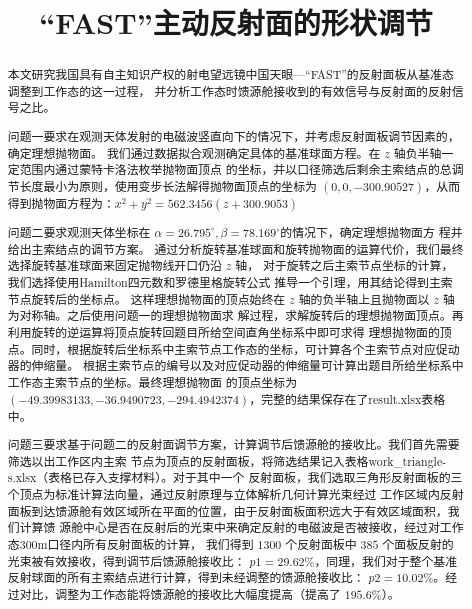 \documentclass[withoutpreface,bwprint]{cumcmthesis} %
\title{“FAST”主动反射面的形状调节}
\begin{document}
\maketitle
\begin{abstract}
本文研究我国具有自主知识产权的射电望远镜中国天眼---“FAST”的反射面板从基准态调整到工作态的这一过程，
并分析工作态时馈源舱接收到的有效信号与反射面的反射信号之比。

问题一要求在观测天体发射的电磁波竖直向下的情况下，并考虑反射面板调节因素的，确定理想抛物面。
我们通过数据拟合观测确定具体的基准球面方程。在 $z$ 轴负半轴一定范围内通过蒙特卡洛法枚举抛物面顶点
的坐标，并以口径筛选后剩余主索结点的总调节长度最小为原则，使用变步长法解得抛物面顶点的坐标为
$(0,0,-300.90527)$，从而得到抛物面方程为：$x^2+y^2=562.3456(z+300.9053)$

问题二要求观测天体坐标在 $\alpha =26.795^\circ,\beta =78.169^\circ$的情况下，确定理想抛物面方
程并给出主索结点的调节方案。
通过分析旋转基准球面和旋转抛物面的运算代价，我们最终选择旋转基准球面来固定抛物线开口仍沿 $z$ 轴，
对于旋转之后主索节点坐标的计算，我们选择使用Hamilton四元数\cite{Hamilton2006}和罗德里格旋转公式
推导一个引理，用其结论得到主索节点旋转后的坐标点。
这样理想抛物面的顶点始终在 $z$ 轴的负半轴上且抛物面以 $z$ 轴为对称轴。之后使用问题一的理想抛物面求
解过程，求解旋转后的理想抛物面顶点。再利用旋转的逆运算将顶点旋转回题目所给空间直角坐标系中即可求得
理想抛物面的顶点。同时，根据旋转后坐标系中主索节点工作态的坐标，可计算各个主索节点对应促动器的伸缩量。
根据主索节点的编号以及对应促动器的伸缩量可计算出题目所给坐标系中工作态主索节点的坐标。最终理想抛物面
的顶点坐标为 $(-49.39983133,-36.9490723,-294.4942374)$，完整的结果保存在了result.xlsx表格中。

问题三要求基于问题二的反射面调节方案，计算调节后馈源舱的接收比。我们首先需要筛选以出工作区内主索
节点为顶点的反射面板，将筛选结果记入表格work\_triangle-s.xlsx（表格已存入支撑材料）。对于其中一个
反射面板，我们选取三角形反射面板的三个顶点为标准计算法向量，通过反射原理与立体解析几何计算光束经过
工作区域内反射面板到达馈源舱有效区域所在平面的位置，由于反射面板面积远大于有效区域面积，我们计算馈
源舱中心是否在反射后的光束中来确定反射的电磁波是否被接收，经过对工作态300m口径内所有反射面板的计算，
我们得到 $1300$ 个反射面板中 $385$ 个面板反射的光束被有效接收，得到调节后馈源舱接收比：
$p1 = 29.62\%$，同理，我们对于整个基准反射球面的所有主索结点进行计算，得到未经调整的馈源舱接收比：
$p2 = 10.02\%$。经过对比，调整为工作态能将馈源舱的接收比大幅度提高（提高了 $195.6\%$）。

\end{abstract}
\end{document}
